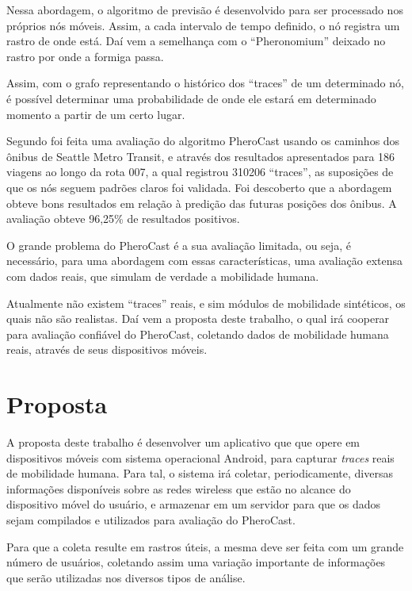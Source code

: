 \documentclass[12pt, %
openright, 
oneside,
a4paper,
brazil]{facom-ufu-abntex2}
\begin{document}
Nessa abordagem, o algoritmo de previsão é desenvolvido para ser processado nos próprios nós móveis. Assim, a cada intervalo de tempo definido, o nó registra um rastro de onde está. Daí vem a semelhança com o ``Pheronomium'' deixado no rastro por onde a formiga passa.

Assim, com o grafo representando o histórico dos ``traces'' de um determinado nó, é possível determinar uma probabilidade de onde ele estará em determinado momento a partir de um certo lugar.


Segundo \cite{fynn} foi feita uma avaliação do algoritmo PheroCast usando os caminhos dos ônibus de Seattle Metro Transit, e através dos resultados apresentados para 186 viagens ao longo da rota 007, a qual registrou 310206 ``traces'', as suposições de que os nós seguem padrões claros foi validada. Foi descoberto que a abordagem obteve bons resultados em relação à predição das futuras posições dos ônibus. A avaliação obteve 96,25\% de resultados positivos. 


O grande problema do PheroCast é a sua avaliação limitada, ou seja, é necessário, para uma abordagem com essas características, uma avaliação extensa com dados reais, que simulam de verdade a mobilidade humana. 

Atualmente não existem ``traces'' reais, e sim módulos de mobilidade sintéticos, os quais não são realistas. Daí vem a proposta deste trabalho, o qual irá cooperar para avaliação confiável do PheroCast, coletando dados de mobilidade humana reais, através de seus dispositivos móveis.

\section{Proposta}
A proposta deste trabalho é desenvolver um aplicativo que que  opere em dispositivos móveis com sistema operacional Android, para capturar \emph{traces} reais de mobilidade humana. Para tal, o sistema irá coletar, periodicamente, diversas informações disponíveis sobre as redes wireless que estão no alcance do dispositivo móvel do usuário, e armazenar em um servidor para que os dados sejam compilados e utilizados para avaliação do PheroCast.

Para que a coleta resulte em rastros úteis, a mesma deve ser feita com um grande número de usuários, coletando assim uma variação importante de informações que serão utilizadas nos diversos tipos de análise. 
\end{document}

